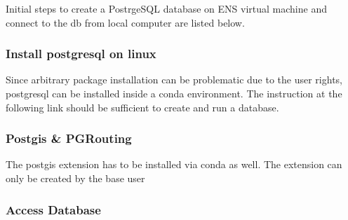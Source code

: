 \documentclass[letterpaper,10pt,english]{sphinxmanual}
\begin{document}
\begin{DUlineblock}{0em}
\item[] Initial steps to create a PostrgeSQL database on ENS virtual machine and connect to the db from local computer are listed below.
\end{DUlineblock}


\subsubsection{Install postgresql on linux}
\label{\detokenize{docs_pylovo/installation:install-postgresql-on-linux}}
\begin{DUlineblock}{0em}
\item[] Since arbitrary package installation can be problematic due to the user rights,
postgresql can be installed inside a conda environment. The instruction at the following link should be sufficient to create and run a database.
\item[] 
\end{DUlineblock}


\subsubsection{Postgis \& PGRouting}
\label{\detokenize{docs_pylovo/installation:postgis-pgrouting}}
\begin{DUlineblock}{0em}
\item[] The postgis extension has to be installed via conda as well. The extension can only be created by the base user
\end{DUlineblock}

\begin{sphinxVerbatim}[commandchars=\\\{\}]
    
    
\end{sphinxVerbatim}


\subsubsection{Access Database}
\label{\detokenize{docs_pylovo/installation:access-database}}
\end{document}
